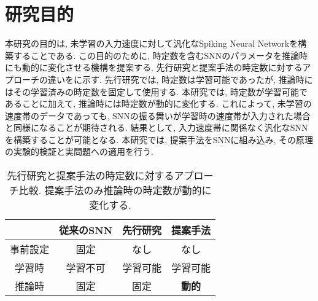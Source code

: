 \section{研究目的}
本研究の目的は, 未学習の入力速度に対して汎化なSpiking Neural Networkを構築することである.
この目的のために, 時定数を含むSNNのパラメータを推論時にも動的に変化させる機構を提案する.
先行研究と提案手法の時定数に対するアプローチの違いをに示す.
先行研究では, 時定数は学習可能であったが, 推論時にはその学習済みの時定数を固定して使用する.
本研究では, 時定数が学習可能であることに加えて, 推論時には時定数が動的に変化する.
これによって, 未学習の速度帯のデータであっても, SNNの振る舞いが学習時の速度帯が入力された場合と同様になることが期待される.
結果として, 入力速度帯に関係なく汎化なSNNを構築することが可能となる.
本研究では, 提案手法をSNNに組み込み, その原理の実験的検証と実問題への適用を行う.
\begin{table}[htb]
    \centering
    \caption[先行研究と提案手法の時定数に対するアプローチ比較]{
        先行研究と提案手法の時定数に対するアプローチ比較. 提案手法のみ推論時の時定数が動的に変化する.
    }
    \label{tab:method:comparison}
    \begin{tabular}{cccc}
        \hline
         & \textbf{従来のSNN} & \textbf{先行研究}\cite{dhsnn,paramsnn} & \textbf{提案手法}\\
        \hline
        事前設定 & 固定 & なし & なし\\
        学習時 & 学習不可 & 学習可能 & 学習可能\\
        推論時 & 固定 & 固定 & \textbf{動的}\\
        \hline
    \end{tabular}
\end{table}
